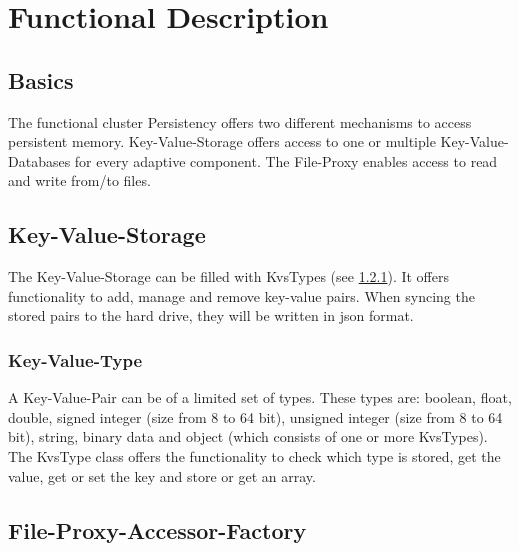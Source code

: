 \chapter{Functional Description}
\label{chap:FunctionalDescription}

\section{Basics}
\label{sec:Basics}
The functional cluster Persistency offers two different mechanisms to access
persistent memory. Key-Value-Storage offers access to one or multiple
Key-Value-Databases for every adaptive component. The File-Proxy enables access
to read and write from/to files.

\section{Key-Value-Storage}
\label{sec:Key-Value-Storage}

The Key-Value-Storage can be filled with KvsTypes (see \ref{sec:Key-Value-Type}). It offers
functionality to add, manage and remove key-value pairs. When syncing the
stored pairs to the hard drive, they will be written in json format.

\subsection{Key-Value-Type}
\label{sec:Key-Value-Type}

A Key-Value-Pair can be of a limited set of types. These types are: boolean,
float, double, signed integer (size from 8 to 64 bit), unsigned integer (size
from 8 to 64 bit), string, binary data and object (which consists of one or
more KvsTypes).
The KvsType class offers the functionality to check which type is stored, get
the value, get or set the key and store or get an array.

\section{File-Proxy-Accessor-Factory}
\label{sec:File-Proxy-Accessor-Factory}

